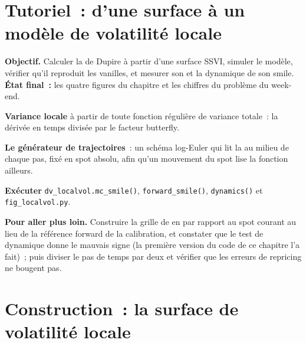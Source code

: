 \section{Tutoriel~: d'une surface à un modèle de volatilité locale}\label{tut:dv:local-volatility:tut}

\begin{tutorial}
\textbf{Objectif.} Calculer la  de Dupire à partir d'une surface SSVI, simuler le modèle, vérifier qu'il
reproduit les vanilles, et mesurer son  et la dynamique de son smile. \textbf{État final~:} les quatre figures
du chapitre et les chiffres du problème du week-end.
\begin{tutsteps}
\item \textbf{Variance locale} à partir de toute fonction régulière de variance totale~: la dérivée en temps divisée par le
facteur butterfly.
\label{lst:dv:local-volatility:dupire}
\item \textbf{Le générateur de trajectoires}~: un schéma log-Euler qui lit la  au milieu de chaque
pas, fixé en spot absolu, afin qu'un mouvement du spot lise la fonction ailleurs.
\label{lst:dv:local-volatility:sim}
\item \textbf{Exécuter} \texttt{dv\_localvol.mc\_smile()}, \texttt{forward\_smile()}, \texttt{dynamics()} et
\texttt{fig\_localvol.py}.
\end{tutsteps}
\textbf{Pour aller plus loin.} Construire la grille de  en  par rapport au spot courant au lieu de
la référence forward de la calibration, et constater que le test de dynamique donne le mauvais signe (la première version du code de ce chapitre
l'a fait)~; puis diviser le pas de temps par deux et vérifier que les erreurs de repricing ne bougent pas.
\end{tutorial}

\section{Construction~: la surface de volatilité locale}\label{bld:dv:local-volatility:localvol}

